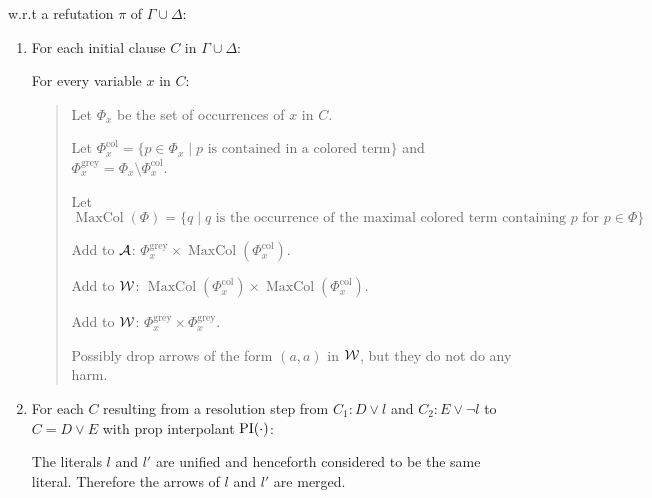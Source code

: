 \documentclass[,%
	paper=a4,%
	DIV10, %
	twoside=false,%
	liststotoc,
	bibtotoc,
	draft=false,%
	numbers=noendperiod
]{scrartcl}
\begin{document}
w.r.t a refutation $\pi$ of $\Gamma \cup \Delta$:

\newcommand{\Phicol}{\Phi^{\operatorname{col}}}
\newcommand{\Phigrey}{\Phi^{\operatorname{grey}}}
\newcommand{\MaxCol}{\operatorname{MaxCol}}
\begin{enumerate}
	\item For each initial clause $C$ in $\Gamma \cup \Delta$:

		For every variable $x$ in $C$:

		\begin{quote}

		Let $\Phi_x$ be the set of occurrences of $x$ in $C$. 

		Let $\Phicol_x = \{p \in \Phi_x \mid \text{$p$ is contained in a colored term} \}$
		and $\Phigrey_x = \Phi_x \setminus \Phicol_x$.

		Let $\MaxCol(\Phi) = \{q \mid \text{$q$ is the occurrence of the maximal colored term containing $p$ for $p \in \Phi$} \}$

		Add to $\operatorname{\mathcal{A}}$: $\Phigrey_x \times \MaxCol(\Phicol_x)$.
		

		Add to $\operatorname{\mathcal{W}}$: $\MaxCol(\Phicol_x) \times \MaxCol(\Phicol_x)$.

		Add to $\operatorname{\mathcal{W}}$: $\Phigrey_x \times \Phigrey_x$.

		Possibly drop arrows of the form $(a, a)$ in $\operatorname{\mathcal{W}}$, but they do not do any harm.
		\end{quote}



	\item 
		For each $C$ resulting from a resolution step from $C_1: D\lor l$ and $C_2: E\lor \lnot l$ to $C = D \lor E$ with prop interpolant $\operatorname{PI}(\cdot)$:

		The literals $l$ and $l'$ are unified and henceforth considered to be the same literal.
		Therefore the arrows of $l$ and $l'$ are merged.




\end{enumerate}
\end{document}
